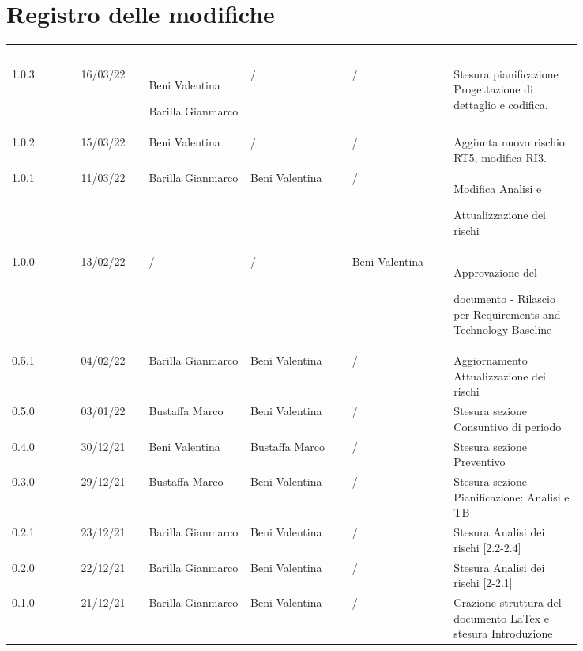 \section*{Registro delle modifiche}

{\renewcommand{\arraystretch}{1.5}
\scriptsize
\begin{tabular}{p{0.10\linewidth}p{0.10\linewidth}p{0.15\linewidth}p{0.15\linewidth}p{0.15\linewidth}p{0.19\linewidth}}
	\rowcolor[RGB]{33, 73, 50}
	\textcolor{white}{\textbf{Versione}} & \textcolor{white}{\textbf{Data}} &
	\textcolor{white}{\textbf{Redattore}} & \textcolor{white}{\textbf{Verificatore}} &
	\textcolor{white}{\textbf{Approvatore}} & \textcolor{white}{\textbf{Descrizione}}\\
	
	\rowcolor[RGB]{216, 235, 171}
	1.0.3 & 16/03/22 & Beni Valentina \par Barilla Gianmarco & / & / & Stesura pianificazione Progettazione di dettaglio e codifica.\\
	\rowcolor[RGB]{233, 245, 206}
	1.0.2 & 15/03/22 & Beni Valentina & / & / & Aggiunta nuovo rischio RT5, modifica RI3.\\
	\rowcolor[RGB]{216, 235, 171}
	1.0.1 & 11/03/22 & Barilla Gianmarco& Beni Valentina & / & Modifica Analisi e\par Attualizzazione dei rischi\\
	\rowcolor[RGB]{233, 245, 206}
	1.0.0 & 13/02/22 & / & / & Beni Valentina & Approvazione del \par documento - Rilascio per Requirements and Technology Baseline\\
	\rowcolor[RGB]{216, 235, 171}
	0.5.1 & 04/02/22 & Barilla Gianmarco& Beni Valentina & / & Aggiornamento Attualizzazione dei rischi\\
	\rowcolor[RGB]{233, 245, 206}
	0.5.0 & 03/01/22 & Bustaffa Marco& Beni Valentina & / & Stesura sezione Consuntivo di periodo\\
	\rowcolor[RGB]{216, 235, 171}
	0.4.0 & 30/12/21 & Beni Valentina& Bustaffa Marco & / & Stesura sezione Preventivo\\
	\rowcolor[RGB]{233, 245, 206}
	0.3.0 & 29/12/21 & Bustaffa Marco& Beni Valentina & / & Stesura sezione Pianificazione: Analisi e TB\\
	\rowcolor[RGB]{216, 235, 171}
	0.2.1 & 23/12/21 & Barilla Gianmarco& Beni Valentina & / & Stesura Analisi dei rischi [2.2-2.4]\\
	\rowcolor[RGB]{233, 245, 206}
	0.2.0 & 22/12/21 & Barilla Gianmarco & Beni Valentina & / & Stesura Analisi dei rischi [2-2.1]\\
	\rowcolor[RGB]{216, 235, 171}
	0.1.0 & 21/12/21 & Barilla Gianmarco & Beni Valentina & / & Crazione struttura del documento LaTex e stesura Introduzione\\	
\end{tabular}	
}
